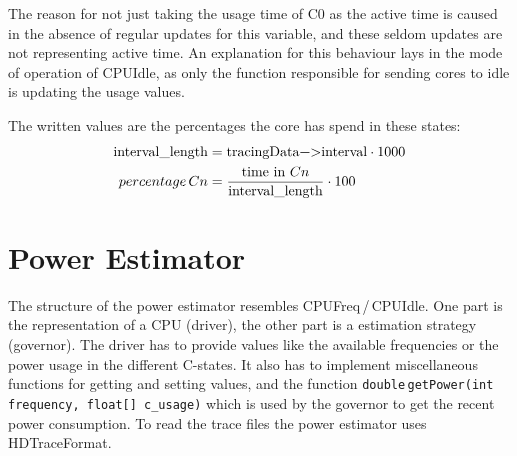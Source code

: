 The reason for not just taking the usage time of C0 as the active time is caused in the absence of regular updates for this variable, and these seldom updates are not representing active time. An explanation for this behaviour lays in the mode of operation of CPUIdle, as only the function responsible for sending cores to idle is updating the usage values.

%
%		
%						
%				
%					

The written values are the percentages the core has spend in these states: 
\begin{align*}
\text{\lstinline!interval_length!} &= \text{\lstinline!tracingData->interval!} \cdot 1000\\
percentage\,Cn &=  \frac{\text{time in } Cn}{\text{\lstinline!interval_length!}} \cdot 100
\end{align*}

%
%
\section{Power Estimator}
The structure of the power estimator resembles CPUFreq\,/\,CPUIdle. One part is the representation of a CPU (driver), the other part is a estimation strategy (governor). The driver has to provide values like the available frequencies or the power usage in the different C-states. It also has to implement miscellaneous functions for getting and setting values, and the function \lstinline!double!\,\lstinline!getPower(int frequency, float[] c_usage)! which is used by the governor to get the recent power consumption. To read the trace files the power estimator uses HDTraceFormat.

